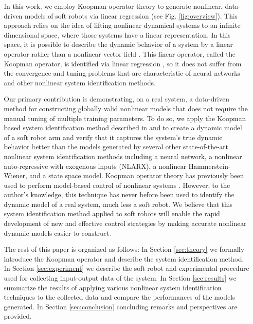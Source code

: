 In this work, we employ Koopman operator theory to generate nonlinear, data-driven models of soft robots via linear regression (see Fig. \ref{fig:overview}).
This approach relies on the idea of lifting nonlinear dynamical systems to an infinite dimensional space, where those systems have a linear representation.
In this space, it is possible to describe the dynamic behavior of a system by a linear operator rather than a nonlinear vector field \cite{budivsic2012applied}.
This linear operator, called the Koopman operator, is identified via linear regression \cite{williams2015data}, so it does not suffer from the convergence and tuning problems that are characteristic of neural networks and other nonlinear system identification methods.


Our primary contribution is demonstrating, on a real system, a data-driven method for constructing globally valid nonlinear models that does not require the manual tuning of multiple training parameters.
To do so, we apply the Koopman based system identification method described in \cite{mauroy2016linear} and \cite{mauroy2017koopman} to create a dynamic model of a soft robot arm and verify that it captures the system's true dynamic behavior better than the models generated by several other state-of-the-art nonlinear system identification methods including a neural network, a nonlinear auto-regressive with exogenous inputs (NLARX), a nonlinear Hammerstein-Wiener, and a state space model.
Koopman operator theory has previously been used to perform model-based control  of nonlinear systems \cite{Abraham-RSS-17}.
However, to the author's knowledge, this technique has never before been used to identify the dynamic model of a real system, much less a soft robot.
We believe that this system identification method applied to soft robots will enable the rapid development of new and effective control strategies by making accurate nonlinear dynamic models easier to construct.


The rest of this paper is organized as follows:
In Section \ref{sec:theory} we formally introduce the Koopman operator and describe the system identification method. 
In Section \ref{sec:experiment} we describe the soft robot and experimental procedure used for collecting input-output data of the system.
In Section \ref{sec:results} we summarize the results of applying various nonlinear system identification techniques to the collected data and compare the performances of the models generated. 
In Section \ref{sec:conclusion} concluding remarks and perspectives are provided.